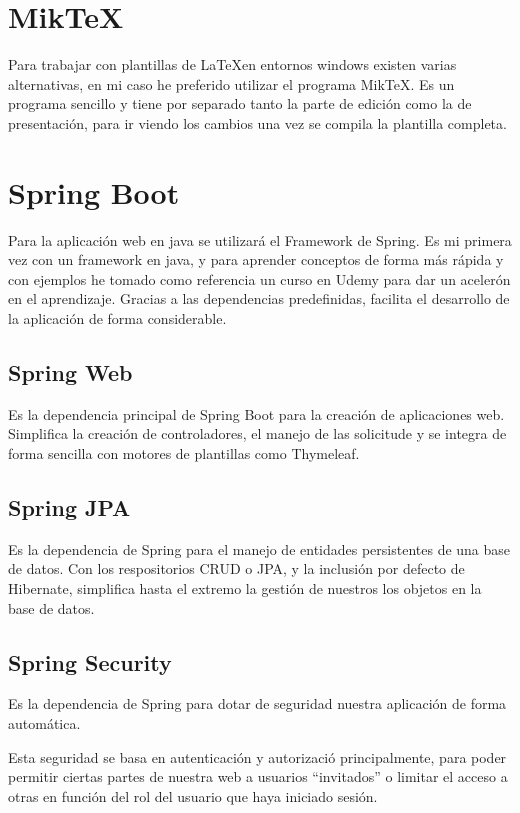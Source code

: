 \section{Mik\TeX{}}
Para trabajar con plantillas de \LaTeX  en entornos windows existen varias alternativas, en mi caso he preferido utilizar el programa Mik\TeX{}.
Es un programa sencillo y tiene por separado tanto la parte de edición como la de presentación, para ir viendo los cambios una vez se compila la plantilla completa.

\section{Spring Boot}

Para la aplicación web en java se utilizará el Framework de Spring.
Es mi primera vez con un framework en java, y para aprender conceptos de forma más rápida y con ejemplos he tomado como referencia un curso en Udemy \cite{udemy:eliseo} para dar un acelerón en el aprendizaje.
Gracias a las dependencias predefinidas, facilita el desarrollo de la aplicación de forma considerable.

\subsection{Spring Web}

Es la dependencia principal de Spring Boot para la creación de aplicaciones web. 
Simplifica la creación de controladores, el manejo de las solicitude y se integra de forma sencilla con motores de plantillas como Thymeleaf.

\subsection{Spring JPA}

Es la dependencia de Spring para el manejo de entidades persistentes de una base de datos. 
Con los respositorios CRUD o JPA, y la inclusión por defecto de Hibernate, simplifica hasta el extremo la gestión de nuestros los objetos en la base de datos.

\subsection{Spring Security}

Es la dependencia de Spring para dotar de seguridad nuestra aplicación de forma automática.

Esta seguridad se basa en autenticación y autorizació principalmente, para poder permitir ciertas partes de nuestra web a usuarios ``invitados'' o limitar el acceso a otras en función del rol del usuario que haya iniciado sesión.

